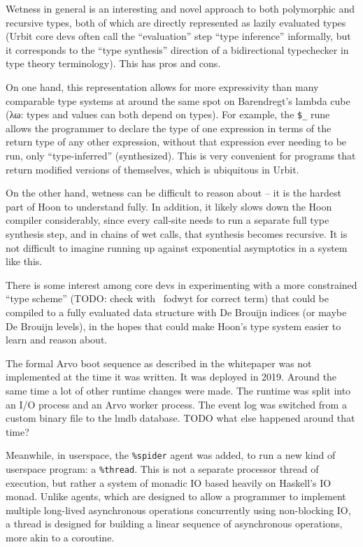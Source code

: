 \documentclass[twoside]{article}
\begin{document}
Wetness in general is an interesting and novel approach to both polymorphic and recursive types, both of which are directly represented as lazily evaluated types (Urbit core devs often call the ``evaluation'' step ``type inference'' informally, but it corresponds to the ``type synthesis'' direction of a bidirectional typechecker in type theory terminology).  This has pros and cons.

On one hand, this representation allows for more expressivity than many comparable type systems at around the same spot on Barendregt's lambda cube (λω: types and values can both depend on types).  For example, the \lstinline[style=inlinecode]{$_} rune allows the programmer to declare the type of one expression in terms of the return type of any other expression, without that expression ever needing to be run, only ``type-inferred'' (synthesized).  This is very convenient for programs that return modified versions of themselves, which is ubiquitous in Urbit.

On the other hand, wetness can be difficult to reason about – it is the hardest part of Hoon to understand fully.  In addition, it likely slows down the Hoon compiler considerably, since every call-site needs to run a separate full type synthesis step, and in chains of wet calls, that synthesis becomes recursive.  It is not difficult to imagine running up against exponential asymptotics in a system like this.

There is some interest among core devs in experimenting with a more constrained ``type scheme'' (TODO: check with ~fodwyt for correct term) that could be compiled to a fully evaluated data structure with De Brouijn indices (or maybe De Brouijn levels), in the hopes that could make Hoon's type system easier to learn and reason about.

The formal Arvo boot sequence as described in the whitepaper was not implemented at the time it was written.  It was deployed in 2019.  Around the same time a lot of other runtime changes were made.  The runtime was split into an I/O process and an Arvo worker process.  The event log was switched from a custom binary file to the {\sc lmdb} database.  TODO what else happened around that time?

Meanwhile, in userspace, the \lstinline[style=inlinecode]{%spider} agent was added, to run a new kind of userspace program: a \lstinline[style=inlinecode]{%thread}.  This is not a separate processor thread of execution, but rather a system of monadic IO based heavily on Haskell's IO monad.  Unlike agents, which are designed to allow a programmer to implement multiple long-lived asynchronous operations concurrently using non-blocking IO, a thread is designed for building a linear sequence of asynchronous operations, more akin to a coroutine.
\end{document}
